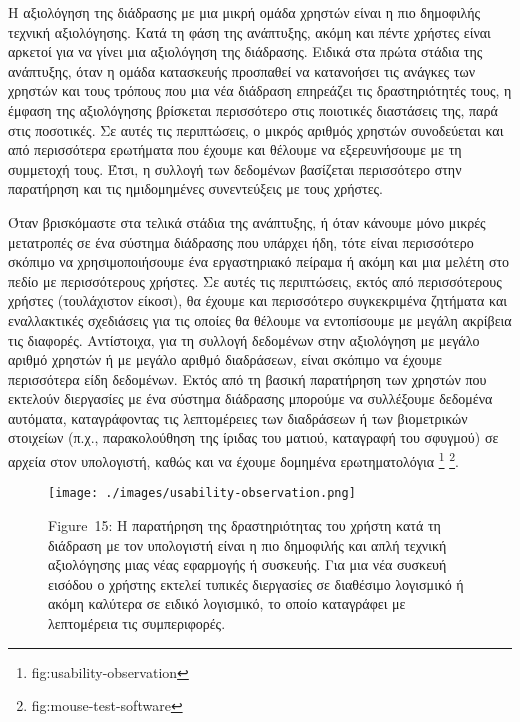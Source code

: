 \documentclass[
]{article}
\begin{document}
Η αξιολόγηση της διάδρασης με μια μικρή ομάδα χρηστών είναι η πιο
δημοφιλής τεχνική αξιολόγησης. Κατά τη φάση της ανάπτυξης, ακόμη και
πέντε χρήστες είναι αρκετοί για να γίνει μια αξιολόγηση της διάδρασης.
Ειδικά στα πρώτα στάδια της ανάπτυξης, όταν η ομάδα κατασκευής προσπαθεί
να κατανοήσει τις ανάγκες των χρηστών και τους τρόπους που μια νέα
διάδραση επηρεάζει τις δραστηριότητές τους, η έμφαση της αξιολόγησης
βρίσκεται περισσότερο στις ποιοτικές διαστάσεις της, παρά στις
ποσοτικές. Σε αυτές τις περιπτώσεις, ο μικρός αριθμός χρηστών
συνοδεύεται και από περισσότερα ερωτήματα που έχουμε και θέλουμε να
εξερευνήσουμε με τη συμμετοχή τους. Έτσι, η συλλογή των δεδομένων
βασίζεται περισσότερο στην παρατήρηση και τις ημιδομημένες συνεντεύξεις
με τους χρήστες.

Όταν βρισκόμαστε στα τελικά στάδια της ανάπτυξης, ή όταν κάνουμε μόνο
μικρές μετατροπές σε ένα σύστημα διάδρασης που υπάρχει ήδη, τότε είναι
περισσότερο σκόπιμο να χρησιμοποιήσουμε ένα εργαστηριακό πείραμα ή ακόμη
και μια μελέτη στο πεδίο με περισσότερους χρήστες. Σε αυτές τις
περιπτώσεις, εκτός από περισσότερους χρήστες (τουλάχιστον είκοσι), θα
έχουμε και περισσότερο συγκεκριμένα ζητήματα και εναλλακτικές σχεδιάσεις
για τις οποίες θα θέλουμε να εντοπίσουμε με μεγάλη ακρίβεια τις
διαφορές. Αντίστοιχα, για τη συλλογή δεδομένων στην αξιολόγηση με μεγάλο
αριθμό χρηστών ή με μεγάλο αριθμό διαδράσεων, είναι σκόπιμο να έχουμε
περισσότερα είδη δεδομένων. Εκτός από τη βασική παρατήρηση των χρηστών
που εκτελούν διεργασίες με ένα σύστημα διάδρασης μπορούμε να συλλέξουμε
δεδομένα αυτόματα, καταγράφοντας τις λεπτομέρειες των διαδράσεων ή των
βιομετρικών στοιχείων (π.χ., παρακολούθηση της ίριδας του ματιού,
καταγραφή του σφυγμού) σε αρχεία στον υπολογιστή, καθώς και να έχουμε
δομημένα ερωτηματολόγια \footnote{fig:usability-observation}
\footnote{fig:mouse-test-software}.

\leavevmode{}%
\begin{figure}
\hypertarget{fig:usability-observation}{%
\centering
\texttt{[image: ./images/usability-observation.png]}
\caption{Figure~15: Η παρατήρηση της δραστηριότητας του χρήστη κατά τη
διάδραση με τον υπολογιστή είναι η πιο δημοφιλής και απλή τεχνική
αξιολόγησης μιας νέας εφαρμογής ή συσκευής. Για μια νέα συσκευή εισόδου
ο χρήστης εκτελεί τυπικές διεργασίες σε διαθέσιμο λογισμικό ή ακόμη
καλύτερα σε ειδικό λογισμικό, το οποίο καταγράφει με λεπτομέρεια τις
συμπεριφορές.}\label{fig:usability-observation}
}
\end{figure}
\end{document}
